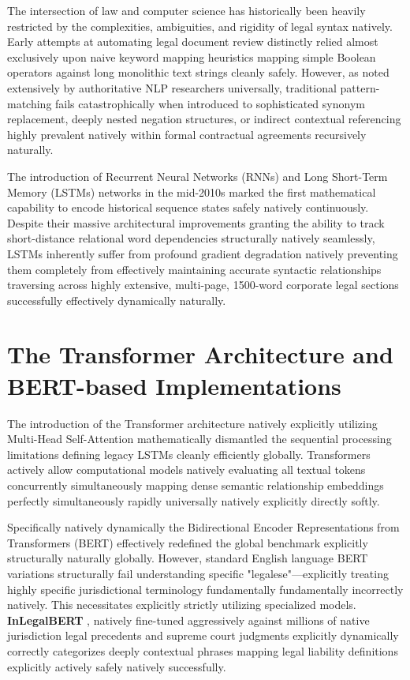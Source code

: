 \documentclass[a4paper,12pt]{report}
\begin{document}
The intersection of law and computer science has historically been heavily restricted by the complexities, ambiguities, and rigidity of legal syntax natively. Early attempts at automating legal document review distinctly relied almost exclusively upon naive keyword mapping heuristics mapping simple Boolean operators against long monolithic text strings cleanly safely. However, as noted extensively by authoritative NLP researchers universally, traditional pattern-matching fails catastrophically when introduced to sophisticated synonym replacement, deeply nested negation structures, or indirect contextual referencing highly prevalent natively within formal contractual agreements recursively naturally. 

The introduction of Recurrent Neural Networks (RNNs) and Long Short-Term Memory (LSTMs) networks in the mid-2010s marked the first mathematical capability to encode historical sequence states safely natively continuously. Despite their massive architectural improvements granting the ability to track short-distance relational word dependencies structurally natively seamlessly, LSTMs inherently suffer from profound gradient degradation natively preventing them completely from effectively maintaining accurate syntactic relationships traversing across highly extensive, multi-page, 1500-word corporate legal sections successfully effectively dynamically naturally.

\section{The Transformer Architecture and BERT-based Implementations}

The introduction of the Transformer architecture natively explicitly utilizing Multi-Head Self-Attention mathematically dismantled the sequential processing limitations defining legacy LSTMs cleanly efficiently globally. Transformers actively allow computational models natively evaluating all textual tokens concurrently simultaneously mapping dense semantic relationship embeddings perfectly simultaneously rapidly universally natively explicitly directly softly.

Specifically natively dynamically the Bidirectional Encoder Representations from Transformers (BERT) effectively redefined the global benchmark explicitly structurally naturally globally. However, standard English language BERT variations structurally fail understanding specific "legalese"—explicitly treating highly specific jurisdictional terminology fundamentally fundamentally incorrectly natively. This necessitates explicitly strictly utilizing specialized models. \textbf{InLegalBERT} \cite{inlegalbert}, natively fine-tuned aggressively against millions of native jurisdiction legal precedents and supreme court judgments explicitly dynamically correctly categorizes deeply contextual phrases mapping legal liability definitions explicitly actively safely natively successfully. 
\end{document}
